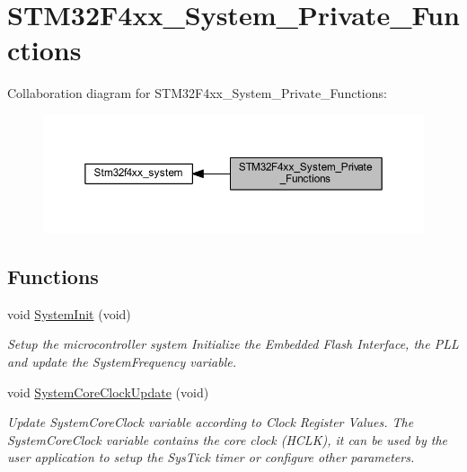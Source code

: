 \hypertarget{group___s_t_m32_f4xx___system___private___functions}{}\section{S\+T\+M32\+F4xx\+\_\+\+System\+\_\+\+Private\+\_\+\+Functions}
\label{group___s_t_m32_f4xx___system___private___functions}
Collaboration diagram for S\+T\+M32\+F4xx\+\_\+\+System\+\_\+\+Private\+\_\+\+Functions\+:\nopagebreak
\begin{figure}[H]
\begin{center}
\leavevmode
\includegraphics[width=350pt]{group___s_t_m32_f4xx___system___private___functions}
\end{center}
\end{figure}
\subsection*{Functions}
\begin{DoxyCompactItemize}
\item 
void \hyperlink{group___s_t_m32_f4xx___system___private___functions_ga93f514700ccf00d08dbdcff7f1224eb2}{System\+Init} (void)
\begin{DoxyCompactList}\small\item\em Setup the microcontroller system Initialize the Embedded Flash Interface, the P\+LL and update the System\+Frequency variable. \end{DoxyCompactList}\item 
void \hyperlink{group___s_t_m32_f4xx___system___private___functions_gae0c36a9591fe6e9c45ecb21a794f0f0f}{System\+Core\+Clock\+Update} (void)
\begin{DoxyCompactList}\small\item\em Update System\+Core\+Clock variable according to Clock Register Values. The System\+Core\+Clock variable contains the core clock (H\+C\+LK), it can be used by the user application to setup the Sys\+Tick timer or configure other parameters. \end{DoxyCompactList}\end{DoxyCompactItemize}


